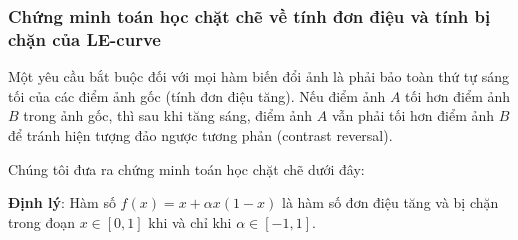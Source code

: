 \documentclass[a4paper]{article}
\begin{document}
\subsubsection{Chứng minh toán học chặt chẽ về tính đơn điệu và tính bị chặn của LE-curve}
Một yêu cầu bắt buộc đối với mọi hàm biến đổi ảnh là phải bảo toàn thứ tự sáng tối của các điểm ảnh gốc (tính đơn điệu tăng). Nếu điểm ảnh $A$ tối hơn điểm ảnh $B$ trong ảnh gốc, thì sau khi tăng sáng, điểm ảnh $A$ vẫn phải tối hơn điểm ảnh $B$ để tránh hiện tượng đảo ngược tương phản (contrast reversal). 

Chúng tôi đưa ra chứng minh toán học chặt chẽ dưới đây:

\noindent \textbf{Định lý}: Hàm số $f(x) = x + \alpha x(1 - x)$ là hàm số đơn điệu tăng và bị chặn trong đoạn $x \in [0, 1]$ khi và chỉ khi $\alpha \in [-1, 1]$.
\end{document}

